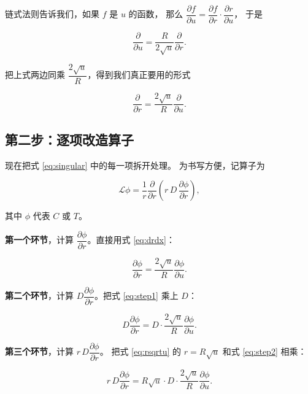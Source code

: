 链式法则告诉我们，如果 $f$ 是 $u$ 的函数，
那么 $\dfrac{\partial f}{\partial u}=\dfrac{\partial f}{\partial r}\cdot\dfrac{\partial r}{\partial u}$，
于是

\begin{equation}
\frac{\partial}{\partial u} = \frac{R}{2\sqrt{u}}\frac{\partial}{\partial r}.
\end{equation}

把上式两边同乘 $\dfrac{2\sqrt{u}}{R}$，得到我们真正要用的形式

\begin{equation}
\boxed{\;\frac{\partial}{\partial r} = \frac{2\sqrt{u}}{R}\frac{\partial}{\partial u}.\;}
\label{eq:drdx}
\end{equation}

\subsection{第二步：逐项改造算子}

现在把式 \eqref{eq:singular} 中的每一项拆开处理。
为书写方便，记算子为

\begin{equation}
\mathcal{L}\phi = \frac{1}{r}\frac{\partial}{\partial r}\left(r\,D\,\frac{\partial\phi}{\partial r}\right),
\end{equation}

其中 $\phi$ 代表 $C$ 或 $T$。

\textbf{第一个环节}，计算 $\dfrac{\partial\phi}{\partial r}$。直接用式 \eqref{eq:drdx}：

\begin{equation}
\frac{\partial\phi}{\partial r} = \frac{2\sqrt{u}}{R}\frac{\partial\phi}{\partial u}.
\label{eq:step1}
\end{equation}

\textbf{第二个环节}，计算 $D\dfrac{\partial\phi}{\partial r}$。把式 \eqref{eq:step1} 乘上 $D$：

\begin{equation}
D\frac{\partial\phi}{\partial r} = D\cdot\frac{2\sqrt{u}}{R}\frac{\partial\phi}{\partial u}.
\label{eq:step2}
\end{equation}

\textbf{第三个环节}，计算 $r\,D\dfrac{\partial\phi}{\partial r}$。
把式 \eqref{eq:rsqrtu} 的 $r=R\sqrt{u}$ 和式 \eqref{eq:step2} 相乘：

\begin{equation}
r\,D\frac{\partial\phi}{\partial r}
= R\sqrt{u}\cdot D\cdot\frac{2\sqrt{u}}{R}\frac{\partial\phi}{\partial u}.
\end{equation}

